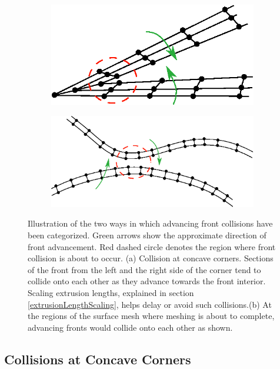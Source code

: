 \begin{figure}
\centering
\begin{subfigure}{0.5\textwidth}
\includegraphics[width=0.9\linewidth]{img/m2/cornerCollision/cornerCollisionIllustration.eps}
\caption{}
\label{fig-cornerCollisionIllustration}
\end{subfigure}%
\begin{subfigure}{0.5\textwidth}
\includegraphics[width =0.9\linewidth]{img/m2/headOnCollision/headOnCollisionIllustration.eps}
\caption{}
\label{fig-headOnCollisionIllustration}
\end{subfigure}
\caption{Illustration of the two ways in which advancing front collisions have been categorized. Green arrows show the approximate direction of front advancement. Red dashed circle denotes the region where front collision is about to occur. (a) Collision at concave corners. Sections of the front from the left and the right side of the corner tend to collide onto each other as they advance towards the front interior. Scaling extrusion lengths, explained in section \ref{extrusionLengthScaling}, helps delay or avoid such collisions.(b) At the regions of the surface mesh where meshing is about to complete, advancing fronts would collide onto each other as shown.}
\label{fig-collisionIllustration}
\end{figure}

\subsection{Collisions at Concave Corners}

